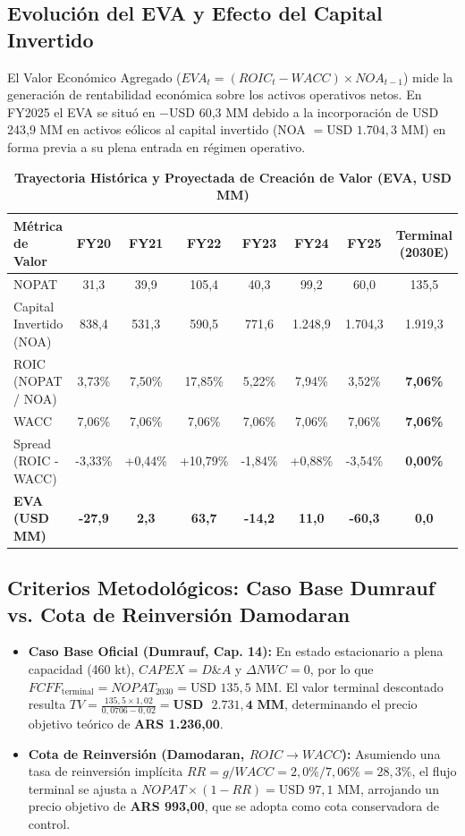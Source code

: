 \documentclass[10pt,a4paper]{article}
\begin{document}
\subsection{Evolución del EVA y Efecto del Capital Invertido}
El Valor Económico Agregado ($EVA_t = (ROIC_t - WACC) \times NOA_{t-1}$) mide la generación de rentabilidad económica sobre los activos operativos netos. En FY2025 el EVA se situó en $-$USD 60,3 MM debido a la incorporación de USD 243,9 MM en activos eólicos al capital invertido (NOA $= \text{USD } 1.704,3\text{ MM}$) en forma previa a su plena entrada en régimen operativo.

\begin{table}[H]
\centering
\caption{\textbf{Trayectoria Histórica y Proyectada de Creación de Valor (EVA, USD MM)}}
\scriptsize
\begin{tabularx}{\textwidth}{Xcccccc|c}
\toprule
\textbf{Métrica de Valor} & \textbf{FY20} & \textbf{FY21} & \textbf{FY22} & \textbf{FY23} & \textbf{FY24} & \textbf{FY25} & \textbf{Terminal (2030E)} \\
\midrule
NOPAT & 31,3 & 39,9 & 105,4 & 40,3 & 99,2 & 60,0 & 135,5 \\
Capital Invertido (NOA) & 838,4 & 531,3 & 590,5 & 771,6 & 1.248,9 & 1.704,3 & 1.919,3 \\
ROIC (NOPAT / NOA) & 3,73\% & 7,50\% & 17,85\% & 5,22\% & 7,94\% & 3,52\% & \textbf{7,06\%} \\
WACC & 7,06\% & 7,06\% & 7,06\% & 7,06\% & 7,06\% & 7,06\% & \textbf{7,06\%} \\
Spread (ROIC - WACC) & -3,33\% & +0,44\% & +10,79\% & -1,84\% & +0,88\% & -3,54\% & \textbf{0,00\%} \\
\textbf{EVA (USD MM)} & \textbf{-27,9} & \textbf{2,3} & \textbf{63,7} & \textbf{-14,2} & \textbf{11,0} & \textbf{-60,3} & \textbf{0,0} \\
\bottomrule
\end{tabularx}
\end{table}

\subsection{Criterios Metodológicos: Caso Base Dumrauf vs. Cota de Reinversión Damodaran}
\begin{itemize}
    \item \textbf{Caso Base Oficial (Dumrauf, Cap. 14):} En estado estacionario a plena capacidad (460 kt), $CAPEX = D\&A$ y $\Delta NWC = 0$, por lo que $FCFF_{\text{terminal}} = NOPAT_{2030} = \text{USD } 135,5\text{ MM}$. El valor terminal descontado resulta $TV = \frac{135,5 \times 1,02}{0,0706 - 0,02} = \mathbf{USD\text{ }2.731,4\text{ MM}}$, determinando el precio objetivo teórico de \textbf{ARS 1.236,00}.
    \item \textbf{Cota de Reinversión (Damodaran, $ROIC \to WACC$):} Asumiendo una tasa de reinversión implícita $RR = g / WACC = 2,0\% / 7,06\% = 28,3\%$, el flujo terminal se ajusta a $NOPAT \times (1 - RR) = \text{USD } 97,1\text{ MM}$, arrojando un precio objetivo de \textbf{ARS 993,00}, que se adopta como cota conservadora de control.
\end{itemize}
\end{document}
